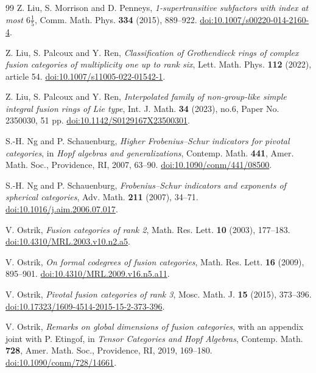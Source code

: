 \documentclass[11pt]{amsart}
\theoremstyle{definition}
\numberwithin{equation}{section}
\begin{document}
\begin{thebibliography}{99}
Z. Liu, S. Morrison and D. Penneys,
\emph{1-supertransitive subfactors with index at most $6\frac15$},
Comm. Math. Phys. \textbf{334} (2015), 889--922.
\href{https://doi.org/10.1007/s00220-014-2160-4}{doi:10.1007/s00220-014-2160-4}.

Z. Liu, S. Palcoux and Y. Ren,
\emph{Classification of Grothendieck rings of complex fusion categories of multiplicity one up to rank six},
Lett. Math. Phys. \textbf{112} (2022), article 54.
\href{https://doi.org/10.1007/s11005-022-01542-1}{doi:10.1007/s11005-022-01542-1}.

Z. Liu, S. Palcoux and Y. Ren,
\emph{Interpolated family of non-group-like simple integral fusion rings of {L}ie type},
Int. J. Math. \textbf{34} (2023), no.6, Paper No. 2350030, 51 pp.
\href{https://doi.org/10.1142/S0129167X23500301}{doi:10.1142/S0129167X23500301}.

S.-H. Ng and P. Schauenburg,
\emph{Higher Frobenius--Schur indicators for pivotal categories},
in \emph{Hopf algebras and generalizations},
Contemp. Math. \textbf{441}, Amer. Math. Soc., Providence, RI, 2007, 63--90.
\href{https://doi.org/10.1090/conm/441/08500}{doi:10.1090/conm/441/08500}.

S.-H. Ng and P. Schauenburg,
\emph{Frobenius--Schur indicators and exponents of spherical categories},
Adv. Math. \textbf{211} (2007), 34--71.
\href{https://doi.org/10.1016/j.aim.2006.07.017}{doi:10.1016/j.aim.2006.07.017}.

V. Ostrik,
\emph{Fusion categories of rank 2},
Math. Res. Lett. \textbf{10} (2003), 177--183.
\href{https://doi.org/10.4310/MRL.2003.v10.n2.a5}{doi:10.4310/MRL.2003.v10.n2.a5}.

V. Ostrik,
\emph{On formal codegrees of fusion categories},
Math. Res. Lett. \textbf{16} (2009), 895--901.
\href{https://doi.org/10.4310/MRL.2009.v16.n5.a11}{doi:10.4310/\allowbreak MRL.2009.v16.n5.a11}.

V. Ostrik,
\emph{Pivotal fusion categories of rank 3},
Mosc. Math. J. \textbf{15} (2015), 373--396.
\href{https://doi.org/10.17323/1609-4514-2015-15-2-373-396}{doi:10.17323/1609-4514-2015-15-2-373-396}.

V. Ostrik,
\emph{Remarks on global dimensions of fusion categories},
with an appendix joint with P. Etingof,
in \emph{Tensor Categories and Hopf Algebras},
Contemp. Math. \textbf{728}, Amer. Math. Soc., Providence, RI, 2019,
169--180.
\href{https://doi.org/10.1090/conm/728/14661}{doi:10.1090/conm/728/14661}.


\end{thebibliography}
\end{document}
